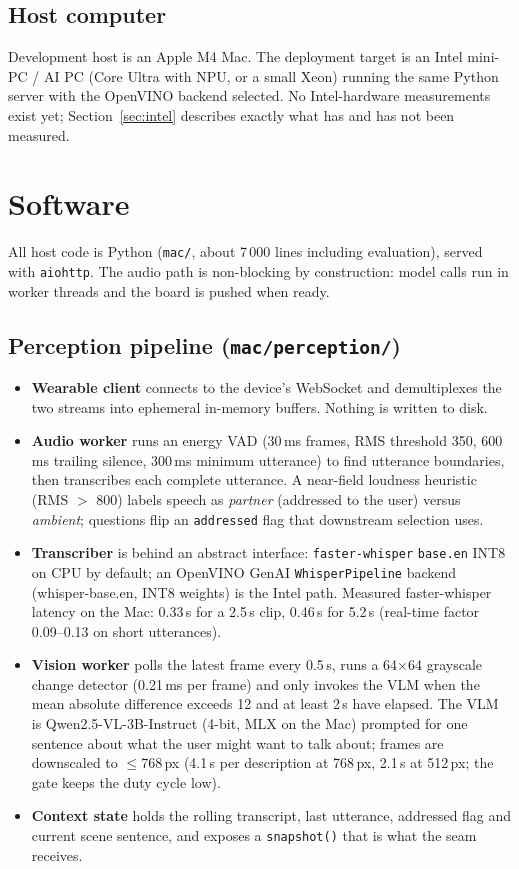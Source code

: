 \documentclass[11pt]{article}
\newcommand{\code}[1]{\texttt{#1}}
\newcommand{\file}[1]{\texttt{\small #1}}
\begin{document}
\subsection{Host computer}
Development host is an Apple M4 Mac. The deployment target is an Intel
mini-PC / AI PC (Core Ultra with NPU, or a small Xeon) running the same Python
server with the OpenVINO backend selected. No Intel-hardware measurements exist
yet; Section~\ref{sec:intel} describes exactly what has and has not been measured.

\section{Software}
All host code is Python (\file{mac/}, about 7\,000 lines including evaluation),
served with \code{aiohttp}. The audio path is non-blocking by construction:
model calls run in worker threads and the board is pushed when ready.

\subsection{Perception pipeline (\file{mac/perception/})}
\begin{itemize}
\item \textbf{Wearable client} connects to the device's WebSocket and demultiplexes the two streams into ephemeral in-memory buffers. Nothing is written to disk.
\item \textbf{Audio worker} runs an energy VAD (30\,ms frames, RMS threshold 350, 600\,ms trailing silence, 300\,ms minimum utterance) to find utterance boundaries, then transcribes each complete utterance. A near-field loudness heuristic (RMS $>$ 800) labels speech as \emph{partner} (addressed to the user) versus \emph{ambient}; questions flip an \code{addressed} flag that downstream selection uses.
\item \textbf{Transcriber} is behind an abstract interface: \code{faster-whisper} \code{base.en} INT8 on CPU by default; an OpenVINO GenAI \code{WhisperPipeline} backend (whisper-base.en, INT8 weights) is the Intel path. Measured faster-whisper latency on the Mac: 0.33\,s for a 2.5\,s clip, 0.46\,s for 5.2\,s (real-time factor 0.09--0.13 on short utterances).
\item \textbf{Vision worker} polls the latest frame every 0.5\,s, runs a 64$\times$64 grayscale change detector (0.21\,ms per frame) and only invokes the VLM when the mean absolute difference exceeds 12 and at least 2\,s have elapsed. The VLM is Qwen2.5-VL-3B-Instruct (4-bit, MLX on the Mac) prompted for one sentence about what the user might want to talk about; frames are downscaled to $\le$768\,px (4.1\,s per description at 768\,px, 2.1\,s at 512\,px; the gate keeps the duty cycle low).
\item \textbf{Context state} holds the rolling transcript, last utterance, addressed flag and current scene sentence, and exposes a \code{snapshot()} that is what the seam receives.
\end{itemize}
\end{document}
